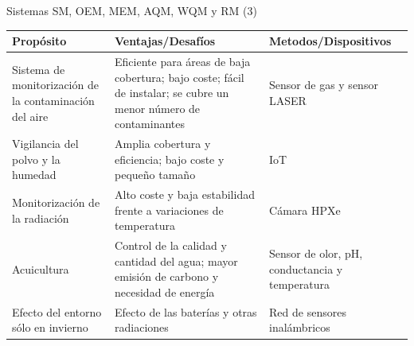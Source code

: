 \documentclass[aspectratio=169,compress]{beamer}
\begin{document}
\begin{frame}{Sistemas SM, OEM, MEM, AQM, WQM y RM (3)}
\begin{center}
\footnotesize
\begin{tabular}{p{4.5cm}|p{4.5cm}|p{4.5cm}}
\hline
\textbf{Propósito} & \textbf{Ventajas/Desafíos} & \textbf{Metodos/Dispositivos} \\
\hline

Sistema de monitorización de la contaminación del aire  &
Eficiente para áreas de baja cobertura; bajo coste; fácil de instalar; se cubre un menor número de contaminantes &
Sensor de gas y sensor LASER \\  \hline

Vigilancia del polvo y la humedad &
Amplia cobertura y eficiencia; bajo coste y pequeño tamaño &
IoT \\  \hline

Monitorización de la radiación &
Alto coste y baja estabilidad frente a variaciones de temperatura &
Cámara HPXe \\  \hline

Acuicultura &
Control de la calidad y cantidad del agua; mayor emisión de carbono y necesidad de energía &
Sensor de olor, pH, conductancia y temperatura \\  \hline

Efecto del entorno sólo en invierno &
Efecto de las baterías y otras radiaciones &
Red de sensores inalámbricos \\  \hline



\end{tabular}
\end{center}

\end{frame}
\end{document}
